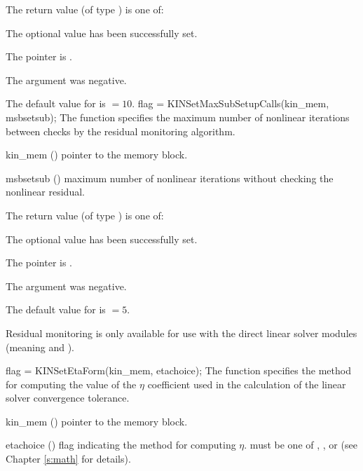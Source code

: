 {
  The return value  (of type ) is one of:
  \begin{args}
  \item[\Id{KIN\_SUCCESS}] 
    The optional value has been successfully set.
  \item[\Id{KIN\_MEM\_NULL}]
    The  pointer is .
  \item[\Id{KIN\_ILL\_INPUT}]
    The argument  was negative.
  \end{args}
}
{
  The default value for  is  $=10$.
}
{
flag = KINSetMaxSubSetupCalls(kin\_mem, msbsetsub);
}
{
  The function  specifies the maximum number of 
  nonlinear iterations between checks by the residual monitoring algorithm.
}
{
  \begin{args}
  \item[kin\_mem] ()
    pointer to the {\kinsol} memory block.
  \item[msbsetsub] ()
    maximum number of nonlinear iterations without checking the
    nonlinear residual.
  \end{args}
}
{
  The return value  (of type ) is one of:
  \begin{args}
  \item[\Id{KIN\_SUCCESS}] 
    The optional value has been successfully set.
  \item[\Id{KIN\_MEM\_NULL}]
    The  pointer is .
  \item[\Id{KIN\_ILL\_INPUT}]
    The argument  was negative.
  \end{args}
}
{
  The default value for  is  $=5$.

  {\warn}Residual monitoring is only available for use with the direct linear solver
  modules (meaning {\kindense} and {\kinband}).
}
{
flag = KINSetEtaForm(kin\_mem, etachoice);
}
{
  The function  specifies the method for computing
  the value of the $\eta$ coefficient used in the calculation of the
  linear solver convergence tolerance.
}
{
  \begin{args}[etachoice]
  \item[kin\_mem] ()
    pointer to the {\kinsol} memory block.
  \item[etachoice] ()
    flag indicating the method for computing $\eta$.  must be one
    of , , or 
    (see Chapter \ref{s:math} for details).
  \end{args}
}
